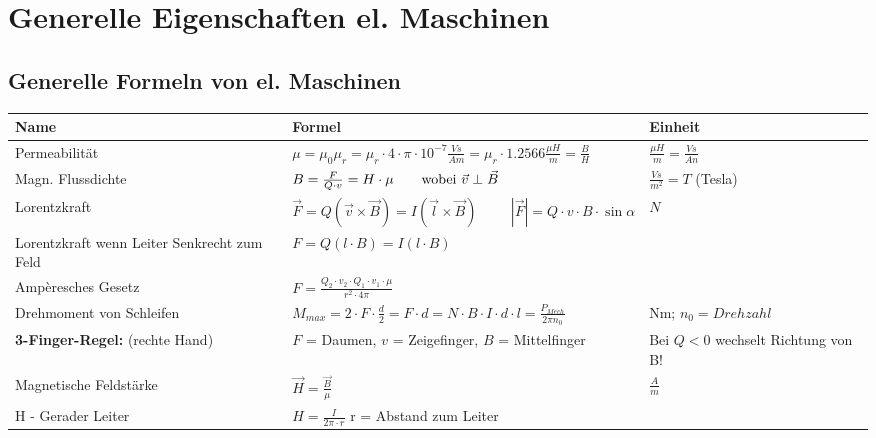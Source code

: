 \section{Generelle Eigenschaften el. Maschinen}
    \subsection{Generelle Formeln von el. Maschinen}
        \renewcommand{\arraystretch}{1.6}
        \begin{tabular}[c]{ | p{5cm} | p{8cm} | p{4cm} | }
            \hline
            \textbf{Name} &
            \textbf{Formel} &
            \textbf{Einheit} \\
            \hline
            Permeabilität &
            $\mu = \mu_0 \mu_r = \mu_r \cdot 4 \cdot \pi \cdot 10^{-7} \frac{Vs}{Am} = \mu_r \cdot 1.2566 \frac{\mu H}{m}=\frac{B}{H}$ &
            $\frac{\mu H}{m}=\frac{Vs}{An}$ \\
            \hline
            Magn. Flussdichte &
            $B = \frac{F}{Q \cdot v} = H \cdot \mu \text{\qquad wobei } \vec{v} \perp \vec{B}$ &
            $\frac{Vs}{m^2} = T$ (Tesla) \\
            \hline
            Lorentzkraft &
            $\vec{F} = Q (\vec{v} \times \vec{B})=I(\vec{l}\times \vec{B}) \hspace{1cm} |\vec{F}| = Q \cdot v \cdot B \cdot \sin\alpha$ &
            $N$ \\
            Lorentzkraft wenn Leiter Senkrecht zum Feld & $ F = Q(l \cdot B) = I(l \cdot B) $& \\
            Ampèresches Gesetz &
            $F=\frac{Q_2 \cdot v_2 \cdot Q_1 \cdot v_1 \cdot \mu}{r^2 \cdot 4\pi}$ &
            \\
            \hline
            Drehmoment von Schleifen &
            $M_{max} = 2 \cdot F \cdot \frac{d}{2}= F \cdot d = N \cdot B \cdot I \cdot d \cdot l = \frac{P_{Mech}}{2 \pi n_0} $ &
            Nm; $n_0= Drehzahl$ \\
            \hline
            \textbf{3-Finger-Regel:} (rechte Hand) &
            $F$ = Daumen, $v$ = Zeigefinger, $B$ = Mittelfinger &
            Bei $Q < 0$ wechselt Richtung von B! \\
            \hline
            Magnetische Feldstärke & 
            $\vec{H} = \frac{ \vec{B}}{\mu }$   &
            $\frac{A}{m}$ \\
            H - Gerader Leiter & $ H = \frac{I}{2 \pi \cdot r}$ r = Abstand zum Leiter& \\ 

\end{tabular}
